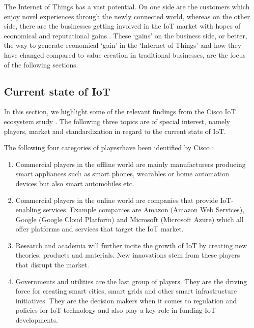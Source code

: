 	The Internet of Things has a vast potential. On one side are the customers which enjoy novel experiences through the newly connected world, whereas on the other side, there are the businesses getting involved in the IoT market with hopes of economical and reputational gains \cite{ju}. These `gains' on the business side, or better, the way to generate economical `gain' in the `Internet of Things' and how they have changed compared to value creation in traditional businesses, are the focus of the following sections. 

	\subsection{Current state of IoT}
		In this section, we highlight some of the relevant findings from the Cisco IoT ecosystem study \cite{cisco}. The following three topics are of special interest, namely players, market and standardization in regard to the current state of IoT.

		The following four categories of playesrhave been identified by Cisco \cite{cisco}: 

		\begin{enumerate}
			\item Commercial players in the offline world are mainly manufacturers producing smart appliances such as smart phones, wearables or home automation devices but also smart automobiles etc.

			\item Commercial players in the online world are companies that provide IoT-enabling services. Example companies are Amazon (Amazon Web Services), Google (Google Cloud Platform) and Microsoft (Microsoft Azure) which all offer platforms and services that target the IoT market.

			\item Research and academia will further incite the growth of IoT by creating new theories, products and materials. New innovations stem from these players that disrupt the market.

			\item Governments and utilities are the last group of players. They are the driving force for creating smart cities, smart grids and other smart infrastructure initiatives. They are the decision makers when it comes to regulation and policies for IoT technology and also play a key role in funding IoT developments.
		\end{enumerate}
		 			
